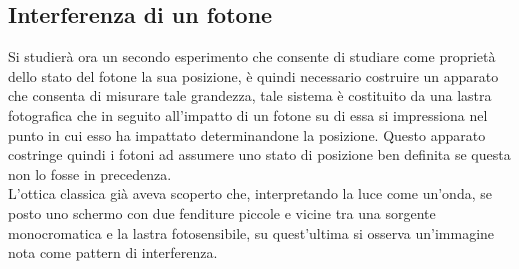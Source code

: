 \subsection{Interferenza di un fotone}
Si studierà ora un secondo esperimento che consente di studiare come proprietà dello stato del fotone la sua posizione, è quindi necessario costruire un apparato che consenta di misurare tale grandezza, tale sistema è costituito da una lastra fotografica che in seguito all'impatto di un fotone su di essa si impressiona nel punto in cui esso ha impattato determinandone la posizione. Questo apparato costringe quindi i fotoni ad assumere uno stato di posizione ben definita se questa non lo fosse in precedenza.\\

L'ottica classica già aveva scoperto che, interpretando la luce come un'onda, se posto uno schermo con due fenditure piccole e vicine tra una sorgente monocromatica e la lastra fotosensibile, su quest'ultima si osserva un'immagine nota come pattern di interferenza. 
